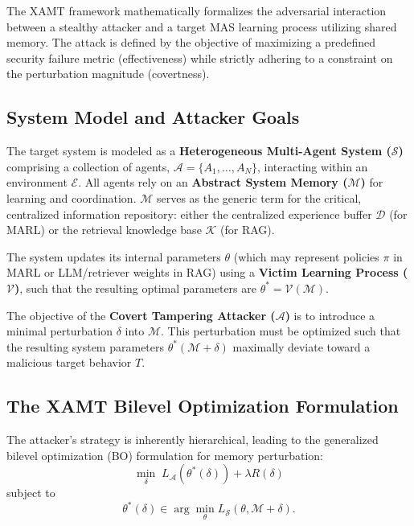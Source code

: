 \documentclass[conference]{IEEEtran}
\begin{document}
The XAMT framework mathematically formalizes the adversarial interaction between a stealthy attacker and a target MAS learning process utilizing shared memory. The attack is defined by the objective of maximizing a predefined security failure metric (effectiveness) while strictly adhering to a constraint on the perturbation magnitude (covertness).

\subsection{System Model and Attacker Goals}
The target system is modeled as a \textbf{Heterogeneous Multi-Agent System ($\mathcal{S}$)} comprising a collection of agents, $\mathcal{A} = \{A_1, \dots, A_N\}$, interacting within an environment $\mathcal{E}$. All agents rely on an \textbf{Abstract System Memory ($\mathcal{M}$)} for learning and coordination. $\mathcal{M}$ serves as the generic term for the critical, centralized information repository: either the centralized experience buffer $\mathcal{D}$ (for MARL) or the retrieval knowledge base $\mathcal{K}$ (for RAG).

The system updates its internal parameters $\theta$ (which may represent policies $\pi$ in MARL or LLM/retriever weights in RAG) using a \textbf{Victim Learning Process ($\mathcal{V}$)}, such that the resulting optimal parameters are $\theta^* = \mathcal{V}(\mathcal{M})$.

The objective of the \textbf{Covert Tampering Attacker ($\mathcal{A}$)} is to introduce a minimal perturbation $\delta$ into $\mathcal{M}$. This perturbation must be optimized such that the resulting system parameters $\theta^*(\mathcal{M}+\delta)$ maximally deviate toward a malicious target behavior $T$.

\subsection{The XAMT Bilevel Optimization Formulation}
The attacker's strategy is inherently hierarchical, leading to the generalized bilevel optimization (BO) formulation for memory perturbation:
\begin{equation}
\min_{\delta}\; L_{\mathcal{A}}(\theta^*(\delta)) + \lambda R(\delta)
\label{eq:xamt_upper}
\end{equation}
subject to
\begin{equation}
\theta^*(\delta) \in \arg\min_{\theta} L_{\mathcal{S}}(\theta, \mathcal{M} + \delta).
\label{eq:xamt_lower}
\end{equation}
\end{document}
